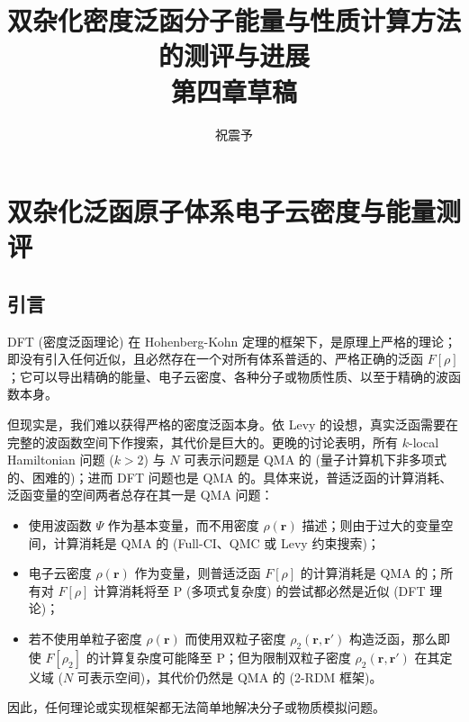 



\title{\textbf{双杂化密度泛函分子能量与性质计算方法的测评与进展\\第四章草稿}}
\author{祝震予}
\maketitle
\vspace{-10pt}

\tableofcontents


\setcounter{section}{3}

\section{双杂化泛函原子体系电子云密度与能量测评}

\subsection{引言}

DFT (密度泛函理论) 在 Hohenberg-Kohn 定理\cite{Hohenberg-Kohn.PR.1964}的框架下，是原理上严格的理论；即没有引入任何近似，且必然存在一个对所有体系普适的、严格正确的泛函 $F[\rho]$；它可以导出精确的能量、电子云密度、各种分子或物质性质、以至于精确的波函数本身。

但现实是，我们难以获得严格的密度泛函本身。依 Levy 的设想\cite{Levy-Levy.PNAS.1979}，真实泛函需要在完整的波函数空间下作搜索，其代价是巨大的。更晚的讨论表明，所有 $k$-local Hamiltonian 问题 ($k > 2$) 与 $N$ 可表示问题是 QMA 的 (量子计算机下非多项式的、困难的)\cite{Kempe-Regev.SJC.2006, Liu-Verstraete.PRL.2007}；进而 DFT 问题也是 QMA 的\cite{Schuch-Verstraete.NP.2009}。具体来说，普适泛函的计算消耗、泛函变量的空间两者总存在其一是 QMA 问题：
\begin{itemize}[nosep]
    \item 使用波函数 $\Psi$ 作为基本变量，而不用密度 $\rho(\bm{r})$ 描述；则由于过大的变量空间，计算消耗是 QMA 的 (Full-CI、QMC 或 Levy 约束搜索)；
    \item 电子云密度 $\rho(\bm{r})$ 作为变量，则普适泛函 $F[\rho]$ 的计算消耗是 QMA 的；所有对 $F[\rho]$ 计算消耗将至 P (多项式复杂度) 的尝试都必然是近似 (DFT 理论)；
    \item 若不使用单粒子密度 $\rho(\bm{r})$ 而使用双粒子密度 $\rho_2(\bm{r}, \bm{r}')$ 构造泛函，那么即使 $F[\rho_2]$ 的计算复杂度可能降至 P；但为限制双粒子密度 $\rho_2 (\bm{r}, \bm{r}')$ 在其定义域 ($N$ 可表示空间)，其代价仍然是 QMA 的 (2-RDM 框架)。
\end{itemize}
因此，任何理论或实现框架都无法简单地解决分子或物质模拟问题。

